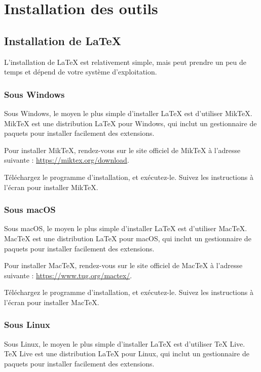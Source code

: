 \documentclass[../main.tex]{subfiles}
\begin{document}
\chapter{Installation des outils}

\section{Installation de \LaTeX{}}

L'installation de \LaTeX{} est relativement simple, mais peut prendre un peu de temps et dépend de votre système d'exploitation.

\subsection{Sous Windows}

Sous Windows, le moyen le plus simple d'installer \LaTeX{} est d'utiliser Mik\TeX{}. Mik\TeX{} est une distribution \LaTeX{} pour Windows, qui inclut un gestionnaire de paquets pour installer facilement des extensions.

Pour installer Mik\TeX{}, rendez-vous sur le site officiel de Mik\TeX{} à l'adresse suivante : \url{https://miktex.org/download}.

Téléchargez le programme d'installation, et exécutez-le. Suivez les instructions à l'écran pour installer Mik\TeX{}.

\subsection{Sous macOS}

Sous macOS, le moyen le plus simple d'installer \LaTeX{} est d'utiliser Mac\TeX{}. Mac\TeX{} est une distribution \LaTeX{} pour macOS, qui inclut un gestionnaire de paquets pour installer facilement des extensions.

Pour installer Mac\TeX{}, rendez-vous sur le site officiel de Mac\TeX{} à l'adresse suivante : \url{https://www.tug.org/mactex/}.

Téléchargez le programme d'installation, et exécutez-le. Suivez les instructions à l'écran pour installer Mac\TeX{}.

\subsection{Sous Linux}

Sous Linux, le moyen le plus simple d'installer \LaTeX{} est d'utiliser TeX Live. TeX Live est une distribution \LaTeX{} pour Linux, qui inclut un gestionnaire de paquets pour installer facilement des extensions.
\end{document}
